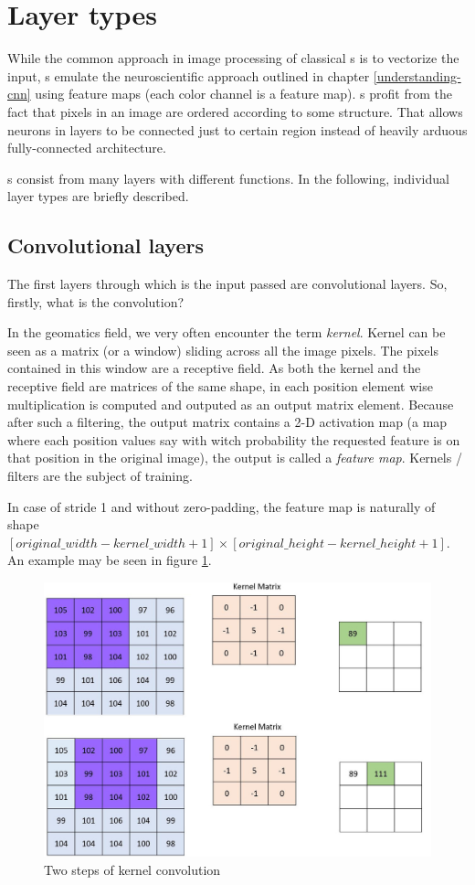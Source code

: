 \section{Layer types}
\label{layers}

While the common approach in image processing of classical s is to vectorize the input, s emulate the neuroscientific approach outlined in chapter \ref{understanding-cnn} using feature maps (each color channel is a feature map). s profit from the fact that pixels in an image are ordered according to some structure. That allows neurons in layers to be connected just to certain region instead of heavily arduous fully-connected architecture. 

s consist from many layers with different functions. In the following, individual layer types are briefly described. 

\subsection{Convolutional layers}
\label{conv-layers}

The first layers through which is the input passed are convolutional layers. So, firstly, what is the convolution? 

In the geomatics field, we very often encounter the term \textit{kernel}. Kernel can be seen as a matrix (or a window) sliding across all the image pixels. The pixels contained in this window are a receptive field. As both the kernel and the receptive field are matrices of the same shape, in each position element wise multiplication is computed and outputed as an output matrix element. Because after such a filtering, the output matrix contains a 2-D activation map (a map where each position values say with witch probability the requested feature is on that position in the original image), the output is called a \textit{feature map}. Kernels / filters are the subject of training. 

In case of stride 1 and without zero-padding, the feature map is naturally of shape $[original\_width - kernel\_width + 1] \times [original\_height - kernel\_height + 1]$. An example may be seen in figure \ref{fig:conv}. 

\begin{figure}[H]
   \centering
	\includegraphics[width=.4\linewidth]{./pictures/conv.jpg}
	\caption[Two steps of kernel convolution]{Two steps of kernel convolution}
      \label{fig:conv}
\end{figure}

